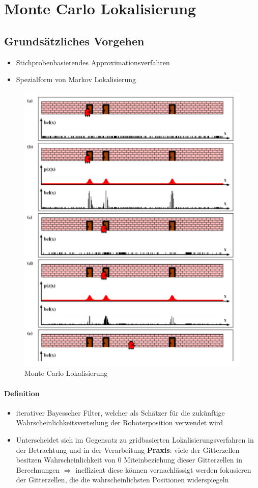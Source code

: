 \section{Monte Carlo Lokalisierung}
\subsection{Grundsätzliches Vorgehen}
\begin{itemize}
	\item Stichprobenbasierendes Approximationsverfahren
	\item Spezialform von Markov Lokalisierung
\end{itemize}
\begin{figure}[H]
	\begin{center}
		\includegraphics[scale=0.6]{Resources/PNG/MonteCarlo.PNG}
		\caption{Monte Carlo Lokalisierung}
		\label{fig:PNG/MonteCarlo.PNG}
	\end{center}
\end{figure}
\paragraph{Definition}
\begin{itemize}
	\item iterativer Bayesscher Filter, welcher als Schätzer für die zukünftige Wahrscheinlichkeitsverteilung der Roboterposition verwendet wird
	\item Unterscheidet sich im Gegensatz zu gridbasierten Lokalisierungsverfahren in der Betrachtung und in der Verarbeitung
	\subitem \textbf{Praxis}: viele der Gitterzellen besitzen Wahrscheinlichkeit von 0
	\subitem Miteinbeziehung dieser Gitterzellen in Berechnungen $\Rightarrow$ ineffizient
	\subitem diese können vernachlässigt werden
	\subitem fokusieren der Gitterzellen, die die wahrscheinlichsten Positionen widerspiegeln
\end{itemize}
